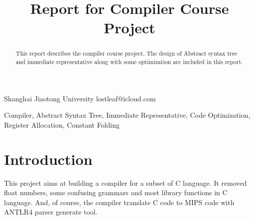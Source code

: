 \documentclass[nocopyrightspace]{sigplanconf}
\begin{document}
\copyrightdata{[to be supplied]}


\title{Report for Compiler Course Project}

           {Shanghai Jiaotong University}
           {lostleaf@icloud.com}

\maketitle

\begin{abstract}
This report describes the compiler course project. The design of Abstract syntax tree and immediate representative along with some optimization are included in this report.
\end{abstract}



\keywords
Compiler, Abstract Syntax Tree, Immediate Representative, Code Optimization, Register Allocation, Constant Folding

\section{Introduction}
This project aims at building a compiler for a subset of C language. It removed float numbers, some confusing grammars and most library functions in C language. And, of course, the compiler translate C code to MIPS code with ANTLR4 parser generate tool.
\end{document}
